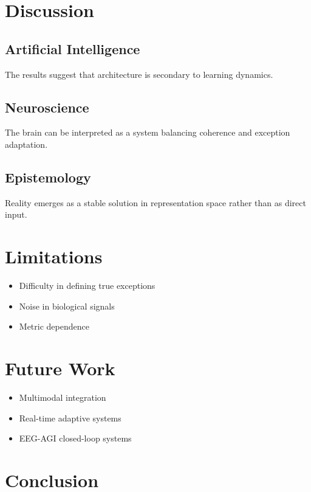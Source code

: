 \documentclass[11pt]{article}
\begin{document}
\section{Discussion}

\subsection{Artificial Intelligence}

The results suggest that architecture is secondary to learning dynamics.

\subsection{Neuroscience}

The brain can be interpreted as a system balancing coherence and exception adaptation.

\subsection{Epistemology}

Reality emerges as a stable solution in representation space rather than as direct input.

\section{Limitations}

\begin{itemize}
    \item Difficulty in defining true exceptions
    \item Noise in biological signals
    \item Metric dependence
\end{itemize}

\section{Future Work}

\begin{itemize}
    \item Multimodal integration
    \item Real-time adaptive systems
    \item EEG-AGI closed-loop systems
\end{itemize}

\section{Conclusion}
\end{document}

